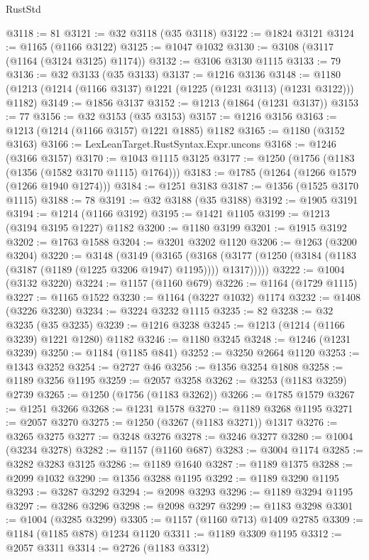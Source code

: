 \begin{lexlean}{RustStd}
\begin{coremodule}
@3118 := 81
@3121 := @32 @3118 (@35 @3118)
@3122 := @1824 @3121
@3124 := @1165 (@1166 @3122)
@3125 := @1047 @1032
@3130 := @3108 (@3117 (@1164 (@3124 @3125) @1174))
@3132 := @3106 @3130 @1115
@3133 := 79
@3136 := @32 @3133 (@35 @3133)
@3137 := @1216 @3136
@3148 := @1180 (@1213 (@1214 (@1166 @3137) @1221 (@1225 (@1231 @3113) (@1231 @3122))) @1182)
@3149 := @1856 @3137
@3152 := @1213 (@1864 (@1231 @3137))
@3153 := 77
@3156 := @32 @3153 (@35 @3153)
@3157 := @1216 @3156
@3163 := @1213 (@1214 (@1166 @3157) @1221 @1885) @1182
@3165 := @1180 (@3152 @3163)
@3166 := LexLeanTarget.RustSyntax.Expr.uncons
@3168 := @1246 (@3166 @3157)
@3170 := @1043 @1115 @3125
@3177 := @1250 (@1756 (@1183 (@1356 (@1582 @3170 @1115) @1764)))
@3183 := @1785 (@1264 (@1266 @1579 (@1266 @1940 @1274)))
@3184 := @1251 @3183
@3187 := @1356 (@1525 @3170 @1115)
@3188 := 78
@3191 := @32 @3188 (@35 @3188)
@3192 := @1905 @3191
@3194 := @1214 (@1166 @3192)
@3195 := @1421 @1105
@3199 := @1213 (@3194 @3195 @1227) @1182
@3200 := @1180 @3199
@3201 := @1915 @3192
@3202 := @1763 @1588
@3204 := @3201 @3202 @1120
@3206 := @1263 (@3200 @3204)
@3220 := @3148
    (@3149
      (@3165
        (@3168 (@3177 (@1250 (@3184 (@1183 (@3187 (@1189 (@1225 @3206 @1947) @1195)))) @1317)))))
@3222 := @1004 (@3132 @3220)
@3224 := @1157 (@1160 @679)
@3226 := @1164 (@1729 @1115)
@3227 := @1165 @1522
@3230 := @1164 (@3227 @1032) @1174
@3232 := @1408 (@3226 @3230)
@3234 := @3224 @3232 @1115
@3235 := 82
@3238 := @32 @3235 (@35 @3235)
@3239 := @1216 @3238
@3245 := @1213 (@1214 (@1166 @3239) @1221 @1280) @1182
@3246 := @1180 @3245
@3248 := @1246 (@1231 @3239)
@3250 := @1184 (@1185 @841)
@3252 := @3250 @2664 @1120
@3253 := @1343 @3252
@3254 := @2727 @46
@3256 := @1356 @3254 @1808
@3258 := @1189 @3256 @1195
@3259 := @2057 @3258
@3262 := @3253 (@1183 @3259) @2739
@3265 := @1250 (@1756 (@1183 @3262))
@3266 := @1785 @1579
@3267 := @1251 @3266
@3268 := @1231 @1578
@3270 := @1189 @3268 @1195
@3271 := @2057 @3270
@3275 := @1250 (@3267 (@1183 @3271)) @1317
@3276 := @3265 @3275
@3277 := @3248 @3276
@3278 := @3246 @3277
@3280 := @1004 (@3234 @3278)
@3282 := @1157 (@1160 @687)
@3283 := @3004 @1174
@3285 := @3282 @3283 @3125
@3286 := @1189 @1640
@3287 := @1189 @1375
@3288 := @2099 @1032
@3290 := @1356 @3288 @1195
@3292 := @1189 @3290 @1195
@3293 := @3287 @3292
@3294 := @2098 @3293
@3296 := @1189 @3294 @1195
@3297 := @3286 @3296
@3298 := @2098 @3297
@3299 := @1183 @3298
@3301 := @1004 (@3285 @3299)
@3305 := @1157 (@1160 @713) @1409 @2785
@3309 := @1184 (@1185 @878) @1234 @1120
@3311 := @1189 @3309 @1195
@3312 := @2057 @3311
@3314 := @2726 (@1183 @3312)

\end{coremodule}
\end{lexlean}
